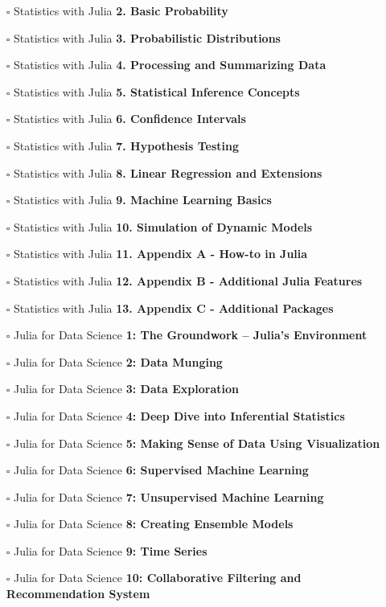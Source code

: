\documentclass[a4, landscape, 12pt]{article}
\newcommand{\checkbox}{$\square$}%
\begin{document}
\begin{itemize}
{}
\item [\checkbox]  Statistics with Julia \textbf{ 2. Basic Probability
}
\item [\checkbox]  Statistics with Julia \textbf{ 3. Probabilistic Distributions
}
\item [\checkbox]  Statistics with Julia \textbf{ 4. Processing and Summarizing Data
}
\item [\checkbox]  Statistics with Julia \textbf{ 5. Statistical Inference Concepts
}
\item [\checkbox]  Statistics with Julia \textbf{ 6. Confidence Intervals
}
\item [\checkbox]  Statistics with Julia \textbf{ 7. Hypothesis Testing
}
\item [\checkbox]  Statistics with Julia \textbf{ 8. Linear Regression and Extensions
}
\item [\checkbox]  Statistics with Julia \textbf{ 9. Machine Learning Basics
}
\item [\checkbox]  Statistics with Julia \textbf{ 10. Simulation of Dynamic Models
}
\item [\checkbox]  Statistics with Julia \textbf{ 11. Appendix A - How-to in Julia
}
\item [\checkbox]  Statistics with Julia \textbf{ 12. Appendix B - Additional Julia Features
}
\item [\checkbox]  Statistics with Julia \textbf{ 13. Appendix C - Additional Packages
}
\item [\checkbox]  Julia for Data Science \textbf{ 1: The Groundwork – Julia's Environment
}
\item [\checkbox]  Julia for Data Science \textbf{ 2: Data Munging
}
\item [\checkbox]  Julia for Data Science \textbf{ 3: Data Exploration
}
\item [\checkbox]  Julia for Data Science \textbf{ 4: Deep Dive into Inferential Statistics
}
\item [\checkbox]  Julia for Data Science \textbf{ 5: Making Sense of Data Using Visualization
}
\item [\checkbox]  Julia for Data Science \textbf{ 6: Supervised Machine Learning
}
\item [\checkbox]  Julia for Data Science \textbf{ 7: Unsupervised Machine Learning
}
\item [\checkbox]  Julia for Data Science \textbf{ 8: Creating Ensemble Models
}
\item [\checkbox]  Julia for Data Science \textbf{ 9: Time Series
}
\item [\checkbox]  Julia for Data Science \textbf{ 10: Collaborative Filtering and Recommendation System
}
\end{itemize}
\end{document}
